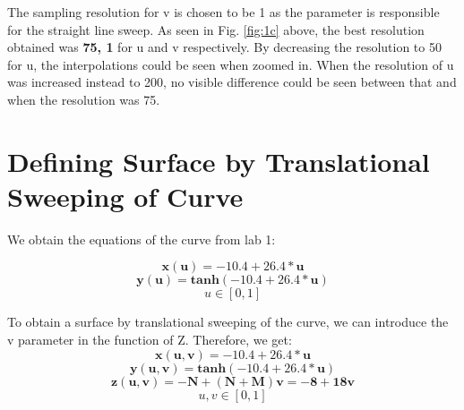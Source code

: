 \documentclass[acmlarge,nonacm=true]{acmart}
\begin{document}
The sampling resolution for v is chosen to be 1 as the parameter is responsible for the straight line sweep.
 As seen in Fig. \ref{fig:1c} above, the best resolution obtained was \textbf{75, 1} for u and v respectively.
By decreasing the resolution to 50 for u, the interpolations could be seen when zoomed in. When the resolution of u was 
increased instead to 200, no visible difference could be seen between that and when the resolution was 75.

\section{Defining Surface by Translational Sweeping of Curve}
We obtain the equations of the curve from lab 1:

\begin{displaymath}
	\mathbf{x(u) = -10.4 + 26.4*u}
\end{displaymath}
\begin{displaymath}
	\mathbf{y(u) = tanh(-10.4 + 26.4*u)}
\end{displaymath}
\begin{displaymath}
	u \in [0,1]
\end{displaymath}

To obtain a surface by translational sweeping of the curve, we can introduce the v parameter in the function of Z.
Therefore, we get:\\
\begin{displaymath}
	\mathbf{x(u,v) = -10.4 + 26.4*u}
\end{displaymath}
\begin{displaymath}
	\mathbf{y(u,v) = tanh(-10.4 + 26.4*u)}
\end{displaymath}
\begin{displaymath}
	\mathbf{z(u,v) = -N + (N+M)v = -8 + 18v}
\end{displaymath}
\begin{displaymath}
	u,v \in [0,1]
\end{displaymath}
\end{document}
